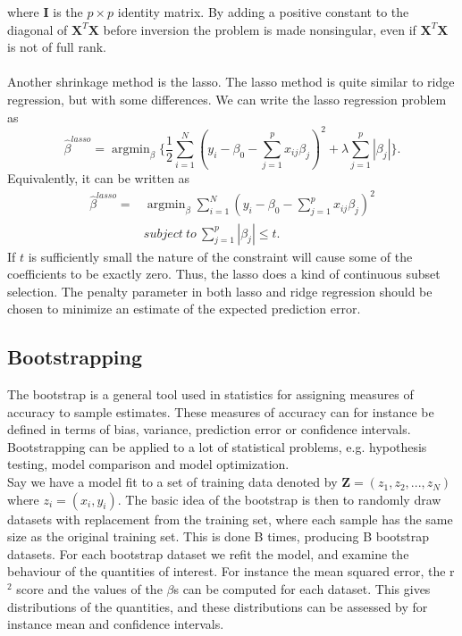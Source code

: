 \documentclass[12pt]{article}
\DeclareMathOperator*{\argmin}{argmin}
\begin{document}
where $\bm{I}$ is the $p\times{p}$ identity matrix. By adding a positive constant to the diagonal of $\bm{X}^T\bm{X}$ before inversion the problem is made nonsingular, even if $\bm{X}^T\bm{X}$ is not of full rank.\\ \\
Another shrinkage method is the lasso. The lasso method is quite similar to ridge regression, but with some differences. We can write the lasso regression problem as
\begin{equation}
\hat{\beta}^{lasso}=\argmin_{\beta}\{\frac{1}{2}\sum_{i=1}^{N}(y_i-\beta_0-\sum_{j=1}^{p}x_{ij}\beta_j)^2+\lambda\sum_{j=1}^{p}\left|\beta_j\right|\}.
\label{eq:lasso}
\end{equation}
Equivalently, it can be written as
\begin{equation}
\begin{split}
\hat{\beta}^{lasso}=&\argmin_{\beta}\sum_{i=1}^{N}(y_i-\beta_0-\sum_{j=1}^{p}x_{ij}\beta_j)^2\\
&subject\ to\ \sum_{j=1}^{p}\left|\beta_j\right|\leq{t}.
\end{split}
\end{equation}
If $t$ is sufficiently small the nature of the constraint will cause some of the coefficients to be exactly zero. Thus, the lasso does a kind of continuous subset selection. The penalty parameter in both lasso and ridge regression should be chosen to minimize an estimate of the expected prediction error.\\
\subsection{Bootstrapping}
The bootstrap is a general tool used in statistics for assigning measures of accuracy to sample estimates. These measures of accuracy can for instance be defined in terms of bias, variance, prediction error or confidence intervals. Bootstrapping can be applied to a lot of statistical problems, e.g. hypothesis testing, model comparison and model optimization.\\
Say we have a model fit to a set of training data denoted by $\bm{Z}=(z_1,z_2,...,z_N)$ where $z_i = (x_i,y_i)$. The basic idea of the bootstrap is then to randomly draw datasets with replacement from the training set, where each sample has the same size as the original training set. This is done B times, producing B bootstrap datasets. For each bootstrap dataset we refit the model, and examine the behaviour of the quantities of interest. For instance the mean squared error, the r$^2$ score and the values of the $\beta$s can be computed for each dataset. This gives distributions of the quantities, and these distributions can be assessed by for instance mean and confidence intervals.
\end{document}
